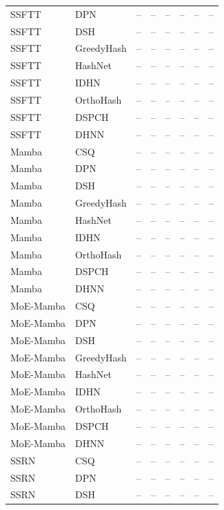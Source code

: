 \begin{longtable}{llrrrrrr}
SSFTT & DPN & -- & -- & -- & -- & -- & -- \\
SSFTT & DSH & -- & -- & -- & -- & -- & -- \\
SSFTT & GreedyHash & -- & -- & -- & -- & -- & -- \\
SSFTT & HashNet & -- & -- & -- & -- & -- & -- \\
SSFTT & IDHN & -- & -- & -- & -- & -- & -- \\
SSFTT & OrthoHash & -- & -- & -- & -- & -- & -- \\
SSFTT & DSPCH & -- & -- & -- & -- & -- & -- \\
SSFTT & DHNN & -- & -- & -- & -- & -- & -- \\
\addlinespace
Mamba & CSQ & -- & -- & -- & -- & -- & -- \\
Mamba & DPN & -- & -- & -- & -- & -- & -- \\
Mamba & DSH & -- & -- & -- & -- & -- & -- \\
Mamba & GreedyHash & -- & -- & -- & -- & -- & -- \\
Mamba & HashNet & -- & -- & -- & -- & -- & -- \\
Mamba & IDHN & -- & -- & -- & -- & -- & -- \\
Mamba & OrthoHash & -- & -- & -- & -- & -- & -- \\
Mamba & DSPCH & -- & -- & -- & -- & -- & -- \\
Mamba & DHNN & -- & -- & -- & -- & -- & -- \\
\addlinespace
MoE-Mamba & CSQ & -- & -- & -- & -- & -- & -- \\
MoE-Mamba & DPN & -- & -- & -- & -- & -- & -- \\
MoE-Mamba & DSH & -- & -- & -- & -- & -- & -- \\
MoE-Mamba & GreedyHash & -- & -- & -- & -- & -- & -- \\
MoE-Mamba & HashNet & -- & -- & -- & -- & -- & -- \\
MoE-Mamba & IDHN & -- & -- & -- & -- & -- & -- \\
MoE-Mamba & OrthoHash & -- & -- & -- & -- & -- & -- \\
MoE-Mamba & DSPCH & -- & -- & -- & -- & -- & -- \\
MoE-Mamba & DHNN & -- & -- & -- & -- & -- & -- \\
\addlinespace
SSRN & CSQ & -- & -- & -- & -- & -- & -- \\
SSRN & DPN & -- & -- & -- & -- & -- & -- \\
SSRN & DSH & -- & -- & -- & -- & -- & -- \\

\end{longtable}
